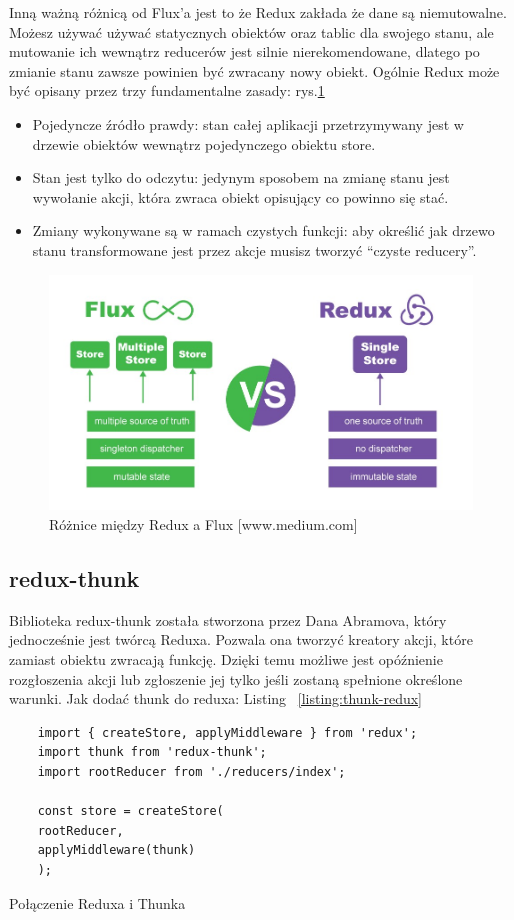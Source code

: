 Inną ważną różnicą od Flux’a jest to że Redux zakłada że dane są niemutowalne.
Możesz używać używać statycznych obiektów oraz tablic dla swojego stanu,
ale mutowanie ich wewnątrz reducerów jest silnie nierekomendowane,
dlatego po zmianie stanu zawsze powinien być zwracany nowy obiekt.
Ogólnie Redux może być opisany przez trzy fundamentalne zasady:
rys.\ref{rys:reduxFlux}
\begin{itemize}
	\item Pojedyncze źródło prawdy: stan całej aplikacji przetrzymywany jest w drzewie obiektów wewnątrz pojedynczego obiektu store.
	\item Stan jest tylko do odczytu: jedynym sposobem na zmianę stanu jest wywołanie akcji, która zwraca obiekt opisujący co powinno się stać.
	\item Zmiany wykonywane są w ramach czystych funkcji: aby określić jak drzewo stanu transformowane jest przez akcje musisz tworzyć “czyste reducery”.
\end{itemize}

\begin{figure}
	\centering\includegraphics[width=.6\textwidth]{img/reduxFlux}
	\caption{Różnice między Redux a Flux [www.medium.com]}\label{rys:reduxFlux}%
\end{figure}

\subsection{redux-thunk}

Biblioteka redux-thunk została stworzona przez Dana Abramova,
który jednocześnie jest twórcą Reduxa. Pozwala ona tworzyć kreatory akcji,
które zamiast obiektu zwracają funkcję.
Dzięki temu możliwe jest opóźnienie rozgłoszenia akcji lub zgłoszenie jej tylko jeśli zostaną spełnione określone warunki.\cite{www_thunk}
Jak dodać thunk do reduxa: Listing
~\ref{listing:thunk-redux}

\begin{listing}
	\begin{verbatim}
	import { createStore, applyMiddleware } from 'redux';
	import thunk from 'redux-thunk';
	import rootReducer from './reducers/index';

	const store = createStore(
	rootReducer,
	applyMiddleware(thunk)
	);
	\end{verbatim}
	\caption{Połączenie Reduxa i Thunka} \label{listing:thunk-redux}
\end{listing}

